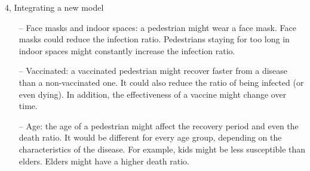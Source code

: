\documentclass[10pt,a4paper]{article}
\begin{document}
\begin{task}{4, Integrating a new model}
\begin{itemize}
    \item[--] Face masks and indoor spaces: a pedestrian might wear a face mask. Face masks could reduce the infection ratio. Pedestrians staying for too long in indoor spaces might constantly increase the infection ratio.
    \item[--] Vaccinated: a vaccinated pedestrian might recover faster from a disease than a non-vaccinated one. It could also reduce the ratio of being infected (or even dying). In addition, the effectiveness of a vaccine might change over time.
    \item[--] Age: the age of a pedestrian might affect the recovery period and even the death ratio. It would be different for every age group, depending on the characteristics of the disease. For example, kids might be less susceptible than elders. Elders might have a higher death ratio.
\end{itemize}

\end{task}

\clearpage
\end{document}
